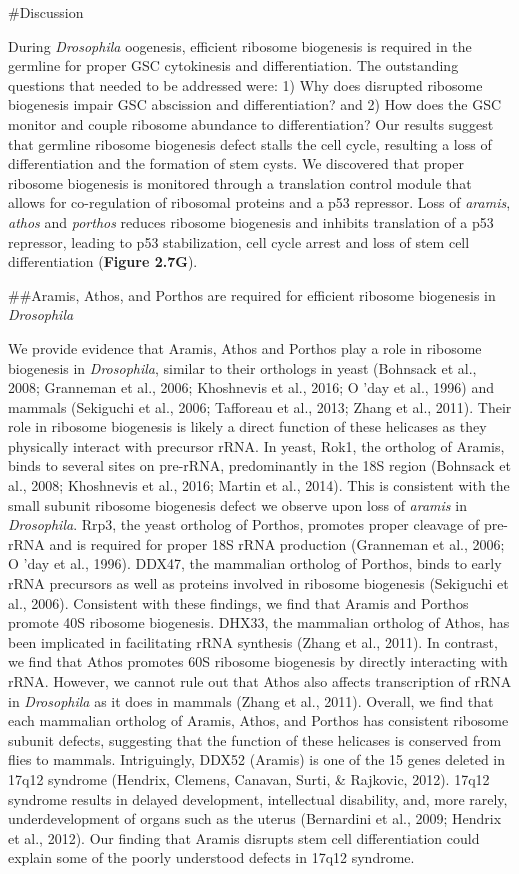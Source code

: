 \documentclass[12pt,twoside]{reedthesis}
\begin{document}
\#Discussion

During \emph{Drosophila} oogenesis, efficient ribosome biogenesis is required
in the germline for proper GSC cytokinesis and differentiation. The
outstanding questions that needed to be addressed were: 1) Why does
disrupted ribosome biogenesis impair GSC abscission and differentiation?
and 2) How does the GSC monitor and couple ribosome abundance to
differentiation? Our results suggest that germline ribosome biogenesis
defect stalls the cell cycle, resulting a loss of differentiation and
the formation of stem cysts. We discovered that proper ribosome
biogenesis is monitored through a translation control module that allows
for co-regulation of ribosomal proteins and a p53 repressor. Loss of
\emph{aramis}, \emph{athos} and \emph{porthos} reduces ribosome biogenesis and inhibits
translation of a p53 repressor, leading to p53 stabilization, cell cycle
arrest and loss of stem cell differentiation (\textbf{Figure 2.7G}).

\#\#Aramis, Athos, and Porthos are required for efficient ribosome biogenesis in \emph{Drosophila}

We provide evidence that Aramis, Athos and Porthos play a role in
ribosome biogenesis in \emph{Drosophila}, similar to their orthologs in yeast
(Bohnsack et al., 2008; Granneman et al., 2006; Khoshnevis et al., 2016; O 'day et al., 1996) and
mammals (Sekiguchi et al., 2006; Tafforeau et al., 2013; Zhang et al., 2011). Their role in ribosome
biogenesis is likely a direct function of these helicases as they
physically interact with precursor rRNA. In yeast, Rok1, the ortholog of
Aramis, binds to several sites on pre-rRNA, predominantly in the 18S
region (Bohnsack et al., 2008; Khoshnevis et al., 2016; Martin et al., 2014). This is consistent with the
small subunit ribosome biogenesis defect we observe upon loss of
\emph{aramis} in \emph{Drosophila}. Rrp3, the yeast ortholog of Porthos, promotes
proper cleavage of pre-rRNA and is required for proper 18S rRNA
production (Granneman et al., 2006; O 'day et al., 1996). DDX47, the
mammalian ortholog of Porthos, binds to early rRNA precursors as well as
proteins involved in ribosome biogenesis
(Sekiguchi et al., 2006). Consistent with these findings,
we find that Aramis and Porthos promote 40S ribosome biogenesis. DHX33,
the mammalian ortholog of Athos, has been implicated in facilitating
rRNA synthesis (Zhang et al., 2011). In contrast,
we find that Athos promotes 60S ribosome biogenesis by directly
interacting with rRNA. However, we cannot rule out that Athos also
affects transcription of rRNA in \emph{Drosophila} as it does in mammals
(Zhang et al., 2011). Overall, we find that each
mammalian ortholog of Aramis, Athos, and Porthos has consistent ribosome
subunit defects, suggesting that the function of these helicases is
conserved from flies to mammals. Intriguingly, DDX52 (Aramis) is one of
the 15 genes deleted in 17q12 syndrome
(Hendrix, Clemens, Canavan, Surti, \& Rajkovic, 2012). 17q12 syndrome results in
delayed development, intellectual disability, and, more rarely,
underdevelopment of organs such as the uterus
(Bernardini et al., 2009; Hendrix et al., 2012). Our finding that Aramis
disrupts stem cell differentiation could explain some of the poorly
understood defects in 17q12 syndrome.
\end{document}
